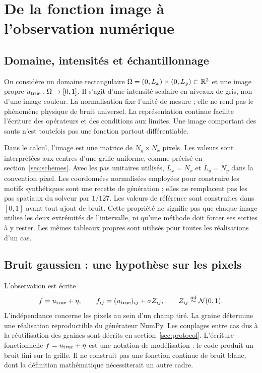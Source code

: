 \section{De la fonction image à l'observation numérique}
\label{sec:images}

\subsection{Domaine, intensités et échantillonnage}
On considère un domaine rectangulaire
$\Omega=(0,L_x)\times(0,L_y)\subset\mathbb{R}^2$ et une image propre
$u_{\mathrm{true}}:\Omega\to[0,1]$. Il s'agit d'une intensité scalaire en niveaux
de gris, non d'une image couleur. La normalisation fixe l'unité de
mesure ; elle ne rend pas le phénomène physique de bruit universel.
La représentation continue facilite l'écriture des opérateurs et des
conditions aux limites. Une image comportant des sauts n'est toutefois
pas une fonction partout différentiable.

Dans le calcul, l'image est une matrice de $N_y\times N_x$ pixels. Les
valeurs sont interprétées aux centres d'une grille uniforme, comme
précisé en section~\ref{sec:schemes}. Avec les pas unitaires utilisés,
$L_x=N_x$ et $L_y=N_y$ dans la convention pixel. Les coordonnées
normalisées employées pour construire les motifs synthétiques sont
une recette de génération ; elles ne remplacent pas les pas spatiaux
du solveur par $1/127$.
Les valeurs de référence sont construites dans $[0,1]$ avant tout
ajout de bruit. Cette propriété ne signifie pas que chaque image utilise
les deux extrémités de l'intervalle, ni qu'une méthode doit forcer ses
sorties à y rester. Les mêmes tableaux propres sont utilisés pour
toutes les réalisations d'un cas.

\subsection{Bruit gaussien : une hypothèse sur les pixels}
L'observation est écrite
\begin{equation}
 f=u_{\mathrm{true}}+\eta,\qquad
 f_{ij}=(u_{\mathrm{true}})_{ij}+\sigma Z_{ij},\qquad
 Z_{ij}\overset{\mathrm{iid}}{\sim}\mathcal N(0,1).
 \label{eq:noise-model}
\end{equation}
L'indépendance concerne les pixels au sein d'un champ tiré. La graine
détermine une réalisation reproductible du générateur NumPy. Les
couplages entre cas dus à la réutilisation des graines sont décrits en
section~\ref{sec:protocol}. L'écriture fonctionnelle $f=u_{\mathrm{true}}+\eta$
est une notation de modélisation : le code produit un bruit fini sur
la grille. Il ne construit pas une fonction continue de bruit blanc,
dont la définition mathématique nécessiterait un autre cadre.

